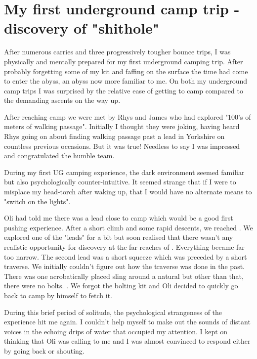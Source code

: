 \section{My first underground camp trip - discovery of "shithole"}
After numerous carries and three progressively tougher bounce trips, I was physically and
mentally prepared for my first underground camping trip. After probably forgetting some of my kit and faffing on the surface the time had come to enter the abyss, an abyss now more familiar to me. On both my underground camp trips I was surprised by the relative ease of getting to camp compared to the demanding ascents on the way up. 

After reaching camp we were met by Rhys and James who had explored "100's of meters of walking passage". Initially I thought they were joking, having heard Rhys going on about finding walking passage past a lead in Yorkshire on countless previous occasions. But it was true! Needless to say I was impressed and congratulated the humble team. 

During my first UG camping experience, the dark environment seemed familiar but also psychologically counter-intuitive. It seemed strange that if I were to misplace my head-torch after waking up, that I would have no alternate means to "switch on the lights". 

Oli had told me there was a lead close to camp which would be a good first pushing experience. After a short climb and some rapid descents, we reached . We explored one of the "leads" for a bit but soon realised that there wasn't any realistic opportunity for discovery at the far reaches of . Everything became far too narrow. The second lead was a short squeeze which was preceded by a short traverse. We initially couldn't figure out how the traverse was done in the past. There was one acrobatically placed sling around a natural but other than that, there were no bolts. . We forgot the bolting kit and Oli decided to quickly go back to camp by himself to fetch it. 

During this brief period of solitude, the psychological strangeness of the experience hit me again. I couldn't help myself to make out the sounds of distant voices in the echoing drips of water that occupied my attention. I kept on thinking that Oli was calling to me and I was almost convinced to respond either by going back or shouting.

